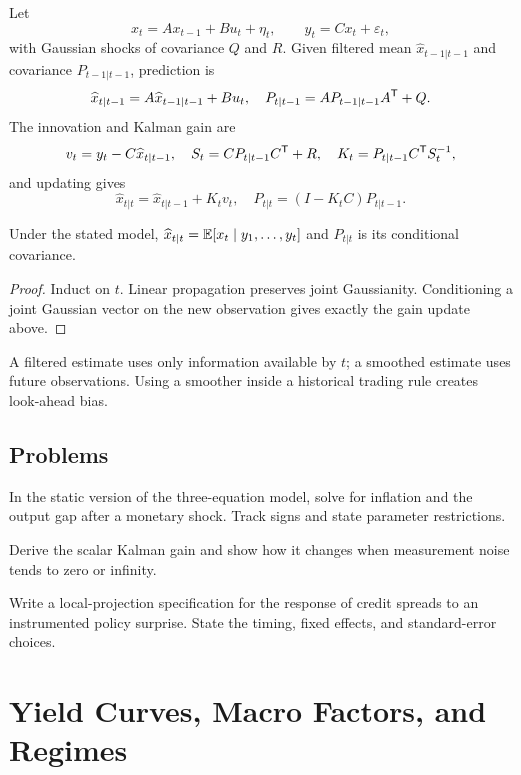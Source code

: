 Let
\[
x_t=Ax_{t-1}+B u_t+\eta_t,\qquad
y_t=Cx_t+\varepsilon_t,
\]
with Gaussian shocks of covariance $Q$ and $R$. Given filtered mean
$\widehat x_{t-1|t-1}$ and covariance $P_{t-1|t-1}$, prediction is
\[
\widehat x_{t|t-1}=A\widehat x_{t-1|t-1}+Bu_t,\quad
P_{t|t-1}=AP_{t-1|t-1}A^\mathsf T+Q.
\]
The innovation and Kalman gain are
\[
v_t=y_t-C\widehat x_{t|t-1},\quad
S_t=CP_{t|t-1}C^\mathsf T+R,\quad
K_t=P_{t|t-1}C^\mathsf T S_t^{-1},
\]
and updating gives
\[
\widehat x_{t|t}=\widehat x_{t|t-1}+K_tv_t,\quad
P_{t|t}=(I-K_tC)P_{t|t-1}.
\]

\begin{theorem}
Under the stated model, $\widehat x_{t|t}=\operatorname{\mathbb E}[x_t\mid y_1,\ldots,y_t]$ and
$P_{t|t}$ is its conditional covariance.
\end{theorem}
\begin{proof}
Induct on $t$. Linear propagation preserves joint Gaussianity. Conditioning a joint
Gaussian vector on the new observation gives exactly the gain update above.
\end{proof}

A filtered estimate uses only information available by $t$; a smoothed estimate uses
future observations. Using a smoother inside a historical trading rule creates
look-ahead bias.

\section{Problems}

\begin{exercise}
In the static version of the three-equation model, solve for inflation and the output
gap after a monetary shock. Track signs and state parameter restrictions.
\end{exercise}
\begin{exercise}
Derive the scalar Kalman gain and show how it changes when measurement noise tends
to zero or infinity.
\end{exercise}
\begin{exercise}
Write a local-projection specification for the response of credit spreads to an
instrumented policy surprise. State the timing, fixed effects, and standard-error
choices.
\end{exercise}


\chapter{Yield Curves, Macro Factors, and Regimes}


